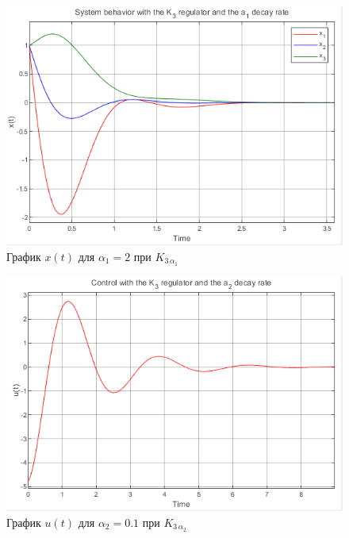\documentclass[a4paper, 12pt]{article}
\begin{document}
    \begin{figure}[H]
        \centering
        \includegraphics{1task_K3a1_x.png}
        \captionsetup{skip=0pt}
        \caption{График $x(t)$ для $\alpha_1=2$ при $K_{3\,\alpha_1}$}
        \label{fig:1task_K3a1_x}
    \end{figure}
    \newpage
    \vspace*{0.01mm}
    \begin{figure}[H]
        \centering
        \includegraphics{1task_K3a2_u.png}
        \captionsetup{skip=0pt}
        \caption{График $u(t)$ для $\alpha_2=0.1$ при $K_{3\,\alpha_2}$}
        \label{fig:1task_K3a2_u}
    \end{figure}
\end{document}
